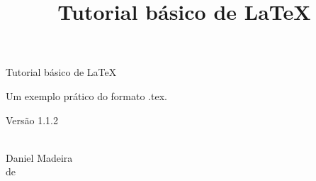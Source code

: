 \documentclass[a4paper,12pt,oneside]{book}
\title{Tutorial básico de \LaTeX} %
\author{\nomeautor} %
\date{\mesano} %
\newcommand{\nomeautor}{Daniel Madeira}
\newcommand{\mesano}{\DTMportugesmonthname{\the\month} de \the\year}
\newcommand{\versaomaior}{1}
\newcommand{\versaomenor}{1}
\newcommand{\versaodecorrecao}{2}
\newenvironment{folharosto}[1]
    {\begin{center}
        \vspace*{\fill}
        {\LARGE #1}\par
        \vspace{2cm}
    }
    {
        \vspace*{\fill}
        \\\large\nomeautor\\\vspace{0.8cm}\small\mesano
        \thispagestyle{empty}
        \renewcommand{\thepage}{rosto}
    \end{center}
    }
\begin{document}
\begin{titlepage}
    \maketitle %
    \renewcommand{\thepage}{capa} %
\end{titlepage}

\pagecolor{gray!5!yellow!5} %

\begin{folharosto}{Tutorial básico de \LaTeX}
Um exemplo prático do formato .tex.\par\vspace{1cm}
Versão \versaomaior.\versaomenor.\versaodecorrecao
\end{folharosto}
\end{document}
